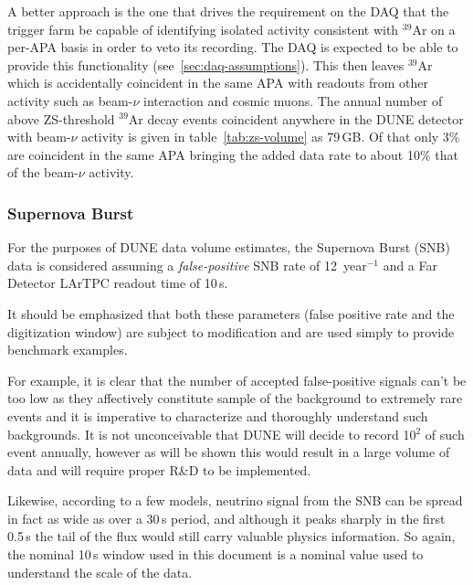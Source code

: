 A better approach is the one that drives the requirement on the DAQ
that the trigger farm be capable of identifying isolated activity
consistent with $^{39}$Ar on a per-APA basis in order to veto its
recording. The DAQ is expected to be able to provide this functionality
(see~\ref{sec:daq-assumptions}).
This then leaves $^{39}$Ar which is accidentally coincident in the
same APA with readouts from other activity such as beam-$\nu$
interaction and cosmic muons.
The annual number of above ZS-threshold $^{39}$Ar decay events
coincident anywhere in the DUNE detector with beam-$\nu$ activity is
given in table~\ref{tab:zs-volume} as 79\,GB. Of that only 3\% are coincident
in the same APA bringing the added data rate to about 10\% that of the beam-$\nu$ activity.

\subsubsection{Supernova Burst}
\label{sec:snb-data}
For the purposes of DUNE data volume estimates, the Supernova Burst (SNB)
data is considered assuming a
\textit{false-positive} SNB rate of 12~year$^{-1}$ and a Far Detector LArTPC
readout time of 10\,s.

It should be emphasized that both these parameters (false positive rate and
the digitization window) are subject to
modification and are used simply to provide benchmark examples.

For example,  it is clear that the number of accepted false-positive signals
can't be too low as they affectively constitute sample of the background
to extremely rare events and it is imperative to characterize and thoroughly
understand such backgrounds. It is not unconceivable that DUNE will decide
to record 10$^2$ of such event annually, however as will be shown this
would result in a large volume of data and will require proper R\&D to be
implemented.

Likewise, according to a few models, neutrino signal from the SNB can be spread
in fact as wide as over a 30\,s period, and although it peaks sharply in the first 0.5\,s
the tail of the flux would still carry valuable physics information. So again,
the nominal 10\,s window used in this document is a nominal value used to understand
the scale of the data.

